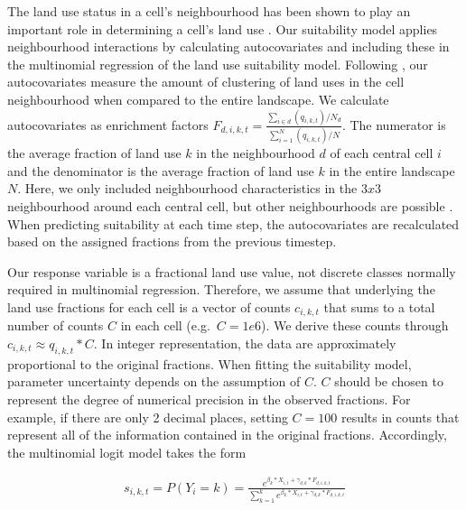 \documentclass[titlesmallcaps,copyrightpage]{uomthesis}\usepackage[]{graphicx}\usepackage[]{color}
\begin{document}
The land use status in a cell's neighbourhood has been shown to play an
important role in determining a cell's land use
\citep{dendoncker_spatial_2007, mustafa_modelling_2018, van_vliet_measuring_2013, verburg_method_2004}.
Our suitability model applies neighbourhood interactions by calculating
autocovariates \citep{verburg_method_2004} and including these in the
multinomial regression of the land use suitability model. Following
\citet{verburg_method_2004}, our autocovariates measure the amount of
clustering of land uses in the cell neighbourhood when compared to the
entire landscape. We calculate autocovariates as enrichment factors
\(F_{d,i,k,t}=\frac{\sum_{i \in d} (q_{i,k,t})/N_d}{\sum_{i=1}^N (q_{i,k,t})/N}\).
The numerator is the average fraction of land use \(k\) in the
neighbourhood \(d\) of each central cell \(i\) and the denominator is
the average fraction of land use \(k\) in the entire landscape \(N\).
Here, we only included neighbourhood characteristics in the \(3x3\)
neighbourhood around each central cell, but other neighbourhoods are
possible \citep{verburg_method_2004}. When predicting suitability at
each time step, the autocovariates are recalculated based on the
assigned fractions from the previous timestep.

Our response variable is a fractional land use value, not discrete
classes normally required in multinomial regression. Therefore, we
assume that underlying the land use fractions for each cell is a vector
of counts \(c_{i,k,t}\) that sums to a total number of counts \(C\) in
each cell (e.g.~\(C=1e6\)). We derive these counts through
\(c_{i,k,t} \approx q_{i,k,t} * C\). In integer representation, the data
are approximately proportional to the original fractions. When fitting
the suitability model, parameter uncertainty depends on the assumption
of \(C\). \(C\) should be chosen to represent the degree of numerical
precision in the observed fractions. For example, if there are only 2
decimal places, setting \(C = 100\) results in counts that represent all
of the information contained in the original fractions. Accordingly, the
multinomial logit model takes the form

\begin{equation}
\begin{aligned}
s_{i,k,t}= P(Y_{i} = k) = \frac{e^{\beta_{k} * X_{i,t} + \gamma_{d,k}*F_{d,i,k,t}}}{\sum_{k=1}^k e^{\beta_{k} * X_{i,t}+ \gamma_{d,k}*F_{d,i,k,t}}}
\end{aligned}
\end{equation}
\end{document}
